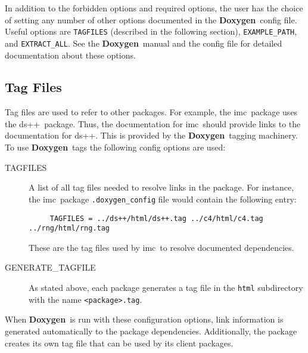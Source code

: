 \documentclass[11pt]{nmemo}
\newcommand{\doxy}{{\normalfont\bfseries Doxygen}}
\newcommand{\imc}{{\normalfont\sffamily imc}}
\newcommand{\dsxx}{{\normalfont\sffamily ds++}}
\begin{document}
In addition to the forbidden options and required options, the user
has the choice of setting any number of other options documented in
the \doxy\ config file.  Useful options are \texttt{TAGFILES}
(described in the following section), \texttt{EXAMPLE\_PATH}, and
\texttt{EXTRACT\_ALL}.  See the \doxy\ manual and the config file for
detailed documentation about these options.
  
\subsection{Tag Files}

Tag files are used to refer to other packages. For example, the \imc\
package uses the \dsxx\ package.  Thus, the documentation for \imc\
should provide links to the documentation for \dsxx.  This is provided 
by the \doxy\ tagging machinery.  To use \doxy\ tags the following
config options are used:
\begin{description}

\item[\ttfamily TAGFILES] A list of all tag files needed to resolve
  links in the package.  For instance, the \imc\ package
  \texttt{.doxygen\_config} file would contain the following entry:
\begin{verbatim}
     TAGFILES = ../ds++/html/ds++.tag ../c4/html/c4.tag ../rng/html/rng.tag
\end{verbatim}
  These are the tag files used by \imc\ to resolve documented
  dependencies.

\item[\ttfamily GENERATE\_TAGFILE] As stated above, each package
  generates a tag file in the \texttt{html} subdirectory with the name 
  \texttt{<package>.tag}.

\end{description}
When \doxy\ is run with these configuration options, link information
is generated automatically to the package dependencies.  Additionally, 
the package creates its own tag file that can be used by its client
packages.
\end{document}
